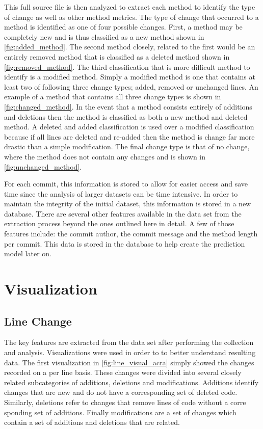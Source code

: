 This full source file is then analyzed to extract each method to identify the type of change as well as other method metrics. The type of change that occurred to a method is identified as one of four possible changes. First, a method may be completely new and is thus classified as a new method shown in \autoref{fig:added_method}. The second method closely, related to the first would be an entirely removed method that is classified as a deleted method shown in \autoref{fig:removed_method}. The third classification that is more difficult method to identify is a modified method. Simply a modified method is one that contains at least two of following three change types; added, removed or unchanged lines. An example of a method that contains all three change types is shown in \autoref{fig:changed_method}. In the event that a method consists entirely of additions and deletions then the method is classified as both a new method and deleted method. A deleted and added classification is used over a modified classification because if all lines are deleted and re-added then the method is change far more drastic than a simple modification. The final change type is that of no change, where the method does not contain any changes and is shown in \autoref{fig:unchanged_method}.

For each commit, this information is stored to allow for easier access and save time since the analysis of larger datasets can be time intensive. In order to maintain the integrity of the initial dataset, this information is stored in a new database. There are several other features available in the data set from the extraction process beyond the ones outlined here in detail. A few of those features include: the commit author, the commit message and the method length per commit. This data is stored in the database to help create the prediction model later on.

\section{Visualization}


\subsection{Line Change}
\label{subsec:line_change}

The key features are extracted from the data set after performing the collection and analysis. Visualizations were used in order to to better understand resulting data. The first visualization in \autoref{fig:line_visual_acra} simply showed the changes recorded on a per line basis. These changes were divided into several closely related subcategories of additions, deletions and modifications. Additions identify changes that are new and do not have a corresponding set of deleted code. Similarly, deletions refer to changes that remove lines of code without a corre sponding set of additions. Finally modifications are a set of changes which contain a set of additions and deletions that are related.

